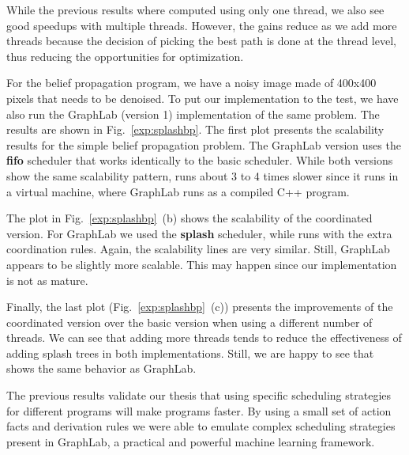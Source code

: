 While the previous results where computed using only one thread, we also see good speedups with multiple threads. However, the gains reduce as we add
more threads because the decision of picking the best path is done at the thread level, thus reducing the opportunities for optimization.

For the belief propagation program, we have a noisy image made of 400x400 pixels that needs to be denoised.
To put our implementation to the test, we have also run the GraphLab (version 1) implementation of the same problem. The results are shown
in Fig.~\ref{exp:splashbp}. The first plot presents the scalability results for the simple belief propagation problem. The GraphLab version
uses the \textbf{fifo} scheduler that works identically to the basic \lang scheduler. While both versions show the same scalability pattern,
\lang runs about 3 to 4 times slower since it runs in a virtual machine, where GraphLab runs as a compiled C++ program.

\begin{figure*}[ht]
   \centering
   \caption{Experimental results for belief propagation with coordination using splashes. The dataset is a 400x400 image.}
   \label{exp:splashbp}
\end{figure*}

The plot in Fig.~\ref{exp:splashbp}~(b) shows the scalability of the coordinated version. For GraphLab we used the \textbf{splash} scheduler, while \lang
runs with the extra coordination rules. Again, the scalability lines are very similar. Still, GraphLab appears to be slightly more scalable.
This may happen since our implementation is not as mature.

Finally, the last plot (Fig.~\ref{exp:splashbp}~(c)) presents the improvements of the coordinated version over the basic version when using a different
number of threads. We can see that adding more threads tends to reduce the effectiveness of adding splash trees in both implementations. Still, we
are happy to see that \lang shows the same behavior as GraphLab.

The previous results validate our thesis that using specific scheduling strategies for different programs will make programs faster. By using a small set
of action facts and derivation rules we were able to emulate complex scheduling strategies present in GraphLab, a practical and powerful machine learning
framework.

